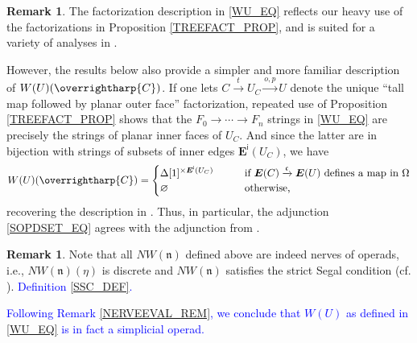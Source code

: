 \documentclass[a4paper,10pt
,draft
]{article}%
\numberwithin{equation}{section}
\numberwithin{figure}{section}
\theoremstyle{definition} %
\newtheorem{remark}[equation]{Remark}%
\newcommand{\vect}[1]{\text{\overrightharp{\ensuremath{#1}}}}
\newcommand{\1}{\ensuremath{\mathbbm 1}}%
\begin{document}
\begin{remark}
        \label{COMPWITHMW_REM}
	The factorization description in \eqref{WU_EQ}
	reflects our heavy use of the factorizations in 
	Proposition \ref{TREEFACT_PROP},
        and is suited for a variety of analyses in \cite{BP_TAS}.
        
	However, the results below also provide a simpler and more familiar description of $W(U)(\vect{C})$.
	If one lets
	$C \xrightarrow{t} U_C \xrightarrow{o,p} U$
	denote the unique ``tall map followed by planar outer face'' factorization, 
	repeated use of Proposition \ref{TREEFACT_PROP}
	shows that the 
	$F_0 \to \cdots \to F_n$
	strings in \eqref{WU_EQ}
	are precisely the strings of planar inner faces of $U_C$.
	And since the latter are in bijection with strings of subsets of inner edges $\boldsymbol{E}^{\mathsf{i}}(U_C)$, 
	we have 
        \begin{equation}\label{WU_EQ2}
                W(U)(\vect C) =
                \begin{cases}
                        \Delta[1]^{\times \boldsymbol{E}^{\mathsf{i}}(U_{C})}
                        \qquad
                        &
                        \mbox{if $\boldsymbol{E}(C) \xrightarrow{\mathfrak{c}} \boldsymbol{E}(U)$ defines a map in $\Omega$}
                        \\
                        \varnothing
                        &
                        \mbox{otherwise,}
                \end{cases}
        \end{equation}
        recovering the description in \cite[\S 4]{CM13b}.
        Thus, in particular, the adjunction \eqref{SOPDSET_EQ} agrees with the adjunction from \cite{CM13b}.
\end{remark}



\begin{remark}
        \label{NWTNS_REM}
	Note that all
	$NW(\mathfrak{n})$ defined above are indeed nerves of operads,
	i.e., 
	$NW(\mathfrak{n})(\eta)$ is discrete
	and
	$NW(\mathfrak{n})$ satisfies the strict Segal condition
	(cf. \cite[Cor 3.69]{BP_geo} ).
        \textcolor{blue}{Definition \ref{SSC_DEF}.}
          
        \textcolor{blue}{Following Remark \ref{NERVEEVAL_REM}, we conclude that
        $W(U)$ as defined in \eqref{WU_EQ} is in fact a simplicial operad.}
\end{remark}
\end{document}
